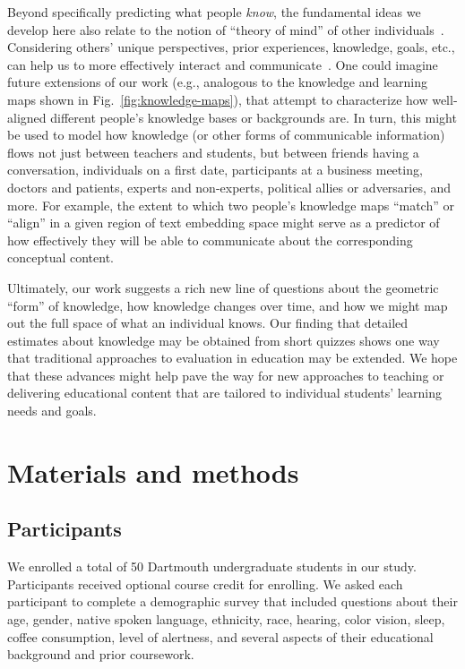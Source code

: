 \documentclass[10pt]{article}
\begin{document}
Beyond specifically predicting what people \textit{know}, the fundamental ideas
we develop here also relate to the notion of ``theory of mind'' of other
individuals~\citep{GoldWinn12, KansEtal15, Melt11}. Considering others' unique
perspectives, prior experiences, knowledge, goals, etc., can help us to more
effectively interact and communicate~\citep{ShaoEtal18, StepBaer06, Ratk18}.
One could imagine future extensions of our work (e.g., analogous to the
knowledge and learning maps shown in Fig.~\ref{fig:knowledge-maps}), that
attempt to characterize how well-aligned different people's knowledge bases or
backgrounds are. In turn, this might be used to model how knowledge (or other
forms of communicable information) flows not just between teachers and
students, but between friends having a conversation, individuals on a first
date, participants at a business meeting, doctors and patients, experts and
non-experts, political allies or adversaries, and more. For example, the extent
to which two people's knowledge maps ``match'' or ``align'' in a given region
of text embedding space might serve as a predictor of how effectively they will
be able to communicate about the corresponding conceptual content.

Ultimately, our work suggests a rich new line of questions about the geometric
``form'' of knowledge, how knowledge changes over time, and how we might map
out the full space of what an individual knows. Our finding that detailed
estimates about knowledge may be obtained from short quizzes shows one way that
traditional approaches to evaluation in education may be extended. We hope that
these advances might help pave the way for new approaches to teaching or
delivering educational content that are tailored to individual students'
learning needs and goals.

\section*{Materials and methods}

\subsection*{Participants}

We enrolled a total of 50 Dartmouth undergraduate students in our study.
Participants received optional course credit for enrolling. We asked each
participant to complete a demographic survey that included questions about
their age, gender, native spoken language, ethnicity, race, hearing, color
vision, sleep, coffee consumption, level of alertness, and several aspects of
their educational background and prior coursework.
\end{document}

